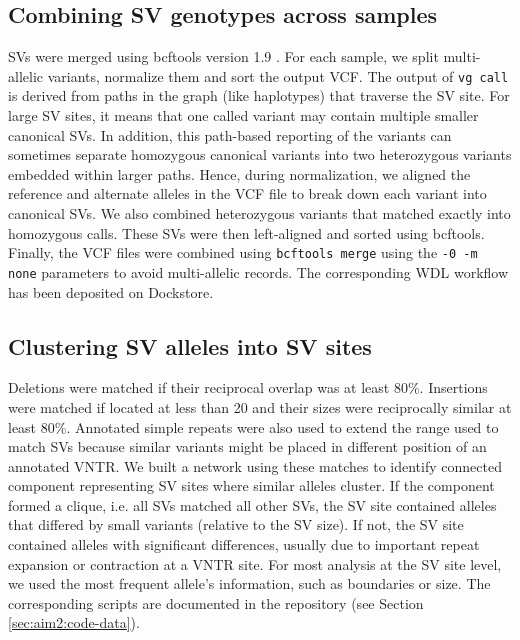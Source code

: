 \documentclass[11pt]{ucscthesis}
\begin{document}
\subsection{Combining SV genotypes across samples}
\label{subsec:aim2:svcombining}

SVs were merged using bcftools version 1.9 \cite{li_samtools_2011}.
For each sample, we split multi-allelic variants, normalize them and sort the output VCF.
The output of \texttt{vg~call} is derived from paths in the graph (like haplotypes) that traverse the SV site.
For large SV sites, it means that one called variant may contain multiple smaller canonical SVs.
In addition, this path-based reporting of the variants can sometimes separate homozygous canonical variants into two heterozygous variants embedded within larger paths.
Hence, during normalization, we aligned the reference and alternate alleles in the VCF file to break down each variant into canonical SVs.
We also combined heterozygous variants that matched exactly into homozygous calls.
These SVs were then left-aligned and sorted using bcftools.
Finally, the VCF files were combined using \texttt{bcftools merge} using the \verb~-0 -m none~ parameters to avoid multi-allelic records.
The corresponding WDL workflow has been deposited on Dockstore\cite{svmerge_dockstore}.


\subsection{Clustering SV alleles into SV sites}
\label{subsec:aim2:svclustering}

Deletions were matched if their reciprocal overlap was at least 80\%.
Insertions were matched if located at less than 20 and their sizes were reciprocally similar at least 80\%.
Annotated simple repeats were also used to extend the range used to match SVs because similar variants might be placed in different position of an annotated VNTR.
We built a network using these matches to identify connected component representing SV sites where similar alleles cluster.
If the component formed a clique, i.e. all SVs matched all other SVs, the SV site contained alleles that differed by small variants (relative to the SV size).
If not, the SV site contained alleles with significant differences, usually due to important repeat expansion or contraction at a VNTR site.
For most analysis at the SV site level, we used the most frequent allele's information, such as boundaries or size.
The corresponding scripts are documented in the repository (see Section \ref{sec:aim2:code-data}).
\end{document}
